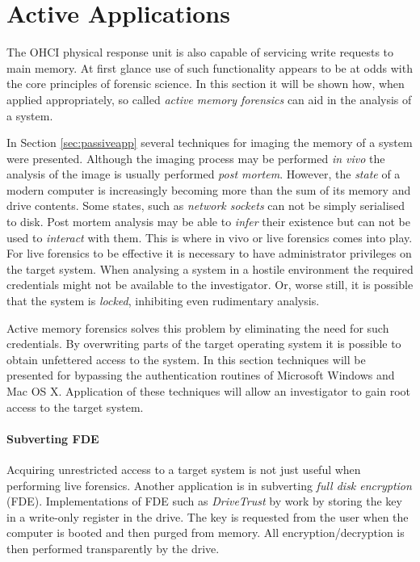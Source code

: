 \documentclass[numbers=noenddot,      %
               abstract,              %
               captions=tableheading, %
               DIV=8]                 %
              {scrartcl}
\begin{document}
\section{Active Applications}
\label{sec:activeapp}

The OHCI physical response unit is also capable of servicing write
requests to main memory. At first glance use of such functionality
appears to be at odds with the core principles of forensic
science. In this section it will be shown how, when applied
appropriately, so called \emph{active memory forensics} can aid in the
analysis of a system.

In Section \ref{sec:passiveapp} several techniques for imaging the
memory of a system were presented. Although the imaging process may be
performed \emph{in vivo} the analysis of the image is usually performed
\emph{post mortem}. However, the \emph{state} of a modern computer is
increasingly becoming more than the sum of its memory and drive
contents. Some states, such as \emph{network sockets} can not be simply
serialised to disk. Post mortem analysis may be able to \emph{infer}
their existence but can not be used to \emph{interact} with them. This
is where in vivo or live forensics comes into play. For live forensics
to be effective it is necessary to have administrator privileges on the
target system. When analysing a system in a hostile environment the
required credentials might not be available to the investigator. Or,
worse still, it is possible that the system is \emph{locked}, inhibiting
even rudimentary analysis.

Active memory forensics solves this problem by eliminating the need for
such credentials. By overwriting parts of the target operating system it
is possible to obtain unfettered access to the system. In this section
techniques will be presented for bypassing the authentication routines
of Microsoft Windows and Mac OS X. Application of these techniques will
allow an investigator to gain root access to the target system. 

\paragraph{Subverting FDE}
Acquiring unrestricted access to a target system is not just useful when
performing live forensics. Another application is in subverting
\emph{full disk encryption} (FDE). Implementations of FDE such as
\emph{DriveTrust} by \cite{seagate06} work by storing the key in a
write-only register in the drive. The key is requested from the user
when the computer is booted and then purged from memory. All
encryption/decryption is then performed transparently by the drive.
\end{document}
